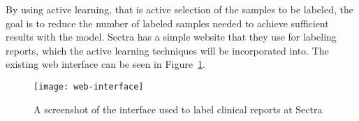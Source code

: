 By using active learning, that is active selection of the samples to be labeled, the goal is to reduce the number of labeled samples needed to achieve sufficient results with the model.
Sectra has a simple website that they use for labeling reports, which the active learning techniques will be incorporated into.
The existing web interface can be seen in Figure~\ref{fig:web-interface}.

\begin{figure}
      \centering
      \texttt{[image: web-interface]}
      \caption{A screenshot of the interface used to label clinical reports at Sectra}
      \label{fig:web-interface}
\end{figure}
